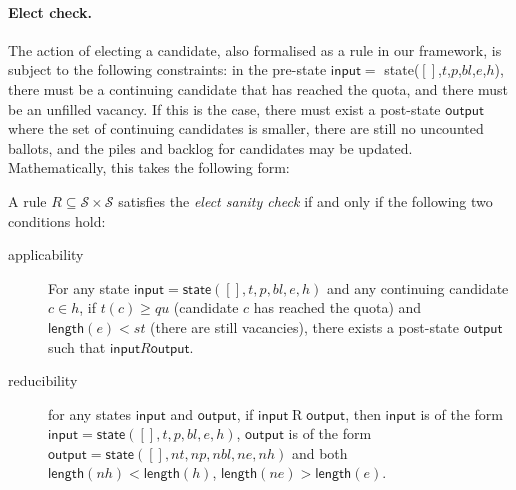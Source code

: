 \documentclass{llncs}
\begin{document}
\paragraph{Elect check.} The action of electing a candidate, also
formalised as a rule in our framework, is subject to the following
constraints: in the pre-state $\mathsf{input} = $
\textsf{state}($[]$,$t$,$p$,$bl$,$e$,$h$), there must be a
continuing candidate that has reached the quota, and there must be
an unfilled vacancy. If this is the case, there must exist a
post-state $\mathsf{output}$ where the set of continuing candidates
is smaller, there are still no uncounted ballots, and the piles and
backlog for candidates may be updated. 
%
Mathematically, this takes the following form:
\begin{definition}\label{elect:check}
A rule $R \subseteq \mathcal{S} \times \mathcal{S}$ satisfies the
\emph{elect sanity check} if and only if the following two
conditions hold:
\begin{description}
\item[applicability]
For any state $\mathsf{input} = \mathsf{state}([], t, p, bl, e, h)$
and any continuing candidate $c \in h$, if $t(c) \geq qu$ (candidate
$c$ has reached the quota) and $\mathsf{length}(e) < st$ (there are
still vacancies), there exists a post-state $\mathsf{output}$ such
that $\mathsf{input} R \mathsf{output}$.
\item[reducibility]
for any states $\mathsf{input}$ and $\mathsf{output}$, if
$\mathsf{input} \mathrel{R} \mathsf{output}$, then $\mathsf{input}$
is of the form $\mathsf{input} = \mathsf{state}([],  t, p, bl, e,
h)$, $\mathsf{output}$ is of the form $\mathsf{output} =
\mathsf{state} ([], nt, np, nbl, ne, nh)$ and both $\mathsf{length}(nh) <
\mathsf{length}(h)$, $\mathsf{length}(ne) > \mathsf{length}(e)$.
\end{description}
\end{definition}
\end{document}
